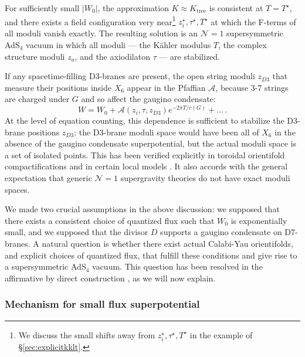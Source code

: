 \documentclass[12pt,a4wide]{article}
\begin{document}
For sufficiently small $|W_0|$, the approximation $K \approx K_{\text{tree}}$ is consistent at $T=T^\star$, and there exists a field configuration very near\footnote{We discuss the small shifts away from
$z_{i}^{\star}, \tau^{\star}, T^\star$ in the example of \S\ref{sec:explicitkklt}.} $z_{i}^{\star}, \tau^{\star}, T^\star$ at which the F-terms of all moduli vanish exactly.  The resulting solution is an $\mathcal{N}=1$ supersymmetric AdS$_4$ vacuum in which all moduli --- the K\"ahler modulus $T$, the complex structure moduli $z_a$, and the axiodilaton $\tau$ --- are stabilized.  

If any spacetime-filling D3-branes are present, the open string moduli $z_{D3}$ that measure their positions inside $X_6$ appear in the Pfaffian $\mathcal{A}$, because 3-7 strings are charged under $G$ and so affect the gaugino condensate:
\begin{equation}
    W = W_0 + \mathcal{A}(z_i,\tau, z_{D3})e^{-2\pi T/c(G)} + \ldots \,.
\end{equation}
At the level of equation counting, this dependence is sufficient to stabilize the D3-brane positions $z_{D3}$: the D3-brane moduli space would have been all of $X_6$ in the absence of the gaugino condensate superpotential, but the actual moduli space is a set of isolated points.  This has been verified explicitly in toroidal orientifold compactifications and in certain local models \cite{DeWolfe:2007hd}.  It also accords with the general expectation that generic $\mathcal{N}=1$ supergravity theories do not have exact moduli spaces.

We made two crucial assumptions in the above discussion: we supposed that there exists a consistent choice of quantized flux such that $W_0$ is exponentially small, and we supposed that the divisor $D$ supports a gaugino condensate on D7-branes.
A natural question is whether there exist actual Calabi-Yau orientifolds, and explicit choices of quantized flux, that fulfill these conditions and give rise to a supersymmetric AdS$_4$ vacuum.  This question has been resolved in the affirmative by direct construction \cite{Demirtas:2021ote,Demirtas:2021nlu, Demirtas:2019sip},
as we will now explain. 

\subsubsection{Mechanism for small flux superpotential}\label{sec:pfv}
\end{document}
